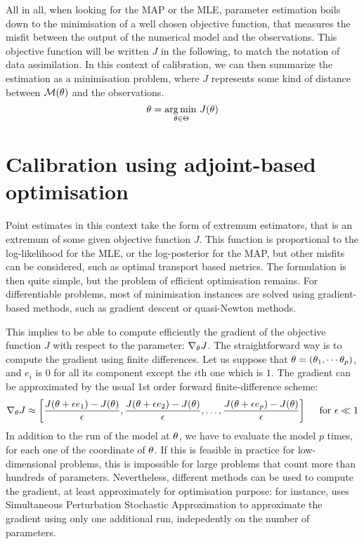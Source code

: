 \documentclass[../../Main_ManuscritThese.tex]{subfiles}
\begin{document}
All in all, when looking for the MAP or the MLE, parameter estimation
boils down to the minimisation of a well chosen objective function,
that measures the misfit between the output of the numerical model and
the observations. This objective function will be written $J$ in the
following, to match the notation of data assimilation.  In this
context of calibration, we can then summarize the estimation as a
minimisation problem, where $J$ represents some kind of distance
between $\mathcal{M}(\theta)$ and the observations.
\begin{equation}
  {\theta}_{\mathrm{}} = \operatorname*{arg\,min \,}_{\theta\in \Theta} J(\theta)
\end{equation}

\section{Calibration using adjoint-based optimisation}
\label{sec:calibration_adjoint_optimization}
Point estimates in this context take the form of extremum estimators,
that is an extremum of some given objective function $J$. This
function is proportional to the log-likelihood for the MLE, or the
log-posterior for the MAP, but other misfits can be considered, such
as optimal transport based metrics. The formulation is then quite
simple, but the problem of efficient optimisation remains. For
differentiable problems, most of minimisation instances are solved
using gradient-based methods, such as gradient descent or quasi-Newton
methods.

This implies to be able to compute efficiently the gradient of the
objective function $J$ with respect to the parameter:
$\nabla_{\theta} J$. The straightforward way is to compute the gradient
using finite differences. Let us suppose that
$\theta = (\theta_1,\cdots \theta_p)$, and $e_i$ is 0 for all its component
except the $i$th one which is $1$. The gradient can be approximated by
the usual 1st order forward finite-difference scheme:
\begin{equation}
  \label{eq:finite_diff}
  \nabla_{\theta} J  \approx \left[\frac{J(\theta + \epsilon e_1) - J(\theta)}{\epsilon}, \frac{J(\theta + \epsilon e_2) - J(\theta)}{ \epsilon},\dots, \frac{J(\theta + \epsilon e_p)- J(\theta)}{\epsilon} \right] \quad \text{ for } \epsilon \ll 1
\end{equation}
In addition to the run of the model at $\theta$, we have to evaluate the
model $p$ times, for each one of the coordinate of $\theta$. If this is
feasible in practice for low-dimensional problems, this is impossible
for large problems that count more than hundreds of
parameters. Nevertheless, different methods can be used to compute the
gradient, at least approximately for optimisation purpose: for
instance, \cite{boutet_estimation_2015} uses Simultaneous Perturbation
Stochastic Approximation to approximate the gradient using only one
additional run, indepedently on the number of parameters.
\end{document}

